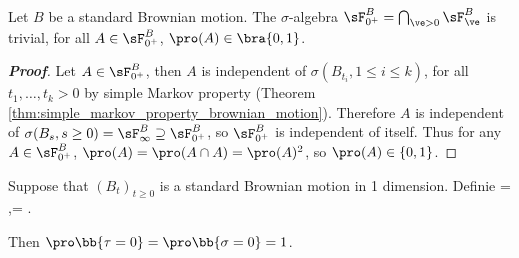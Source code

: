 \begin{theorem}\label{thm:blumenthal_zero_one_law}
Let $B$ be a standard Brownian motion. The $\sigma$-algebra $\sF^B_{0^+} = \bigcap_{\ve>0} \sF^B_\ve$ is trivial, for all
$A \in \sF^B_{0^+}$, $\pro(A) \in \bra{0, 1}$. %
\end{theorem}



\begin{proof}[\bf Proof]
Let $A \in \sF^B_{0^+}$, then $A$ is independent of $\sigma(B_{t_i} , 1 \leq i \leq k)$, for all $t_1, \dots , t_k > 0$ %
by simple Markov property (Theorem \ref{thm:simple_markov_property_brownian_motion}).
Therefore $A$ is independent of $\sigma(B_s, s \geq 0) = \sF^B_\infty \supseteq \sF^B_{0^+}$, so $\sF^B_{0^+}$ is independent of itself. Thus for any $A \in \sF^B_{0^+}$, $\pro(A) = \pro(A\cap A) = \pro(A)^2$, so $\pro(A) \in \{0, 1\}$.
\end{proof}

\begin{proposition}
Suppose that $(B_t)_{t\geq 0}$ is a standard Brownian motion in 1 dimension. Definie
\be
\tau = \inf{},\quad \quad \sigma = \inf{}.
\ee

Then $\pro\bb{\tau = 0} = \pro\bb{\sigma = 0} = 1$.
\end{proposition}

